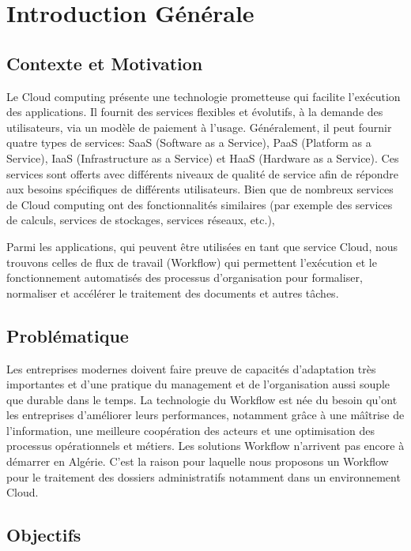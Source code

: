 \chapter*{Introduction Générale }


\section*{Contexte et Motivation} 
Le Cloud computing  présente une technologie prometteuse qui facilite l'exécution des applications. Il fournit des services flexibles et évolutifs, à la demande des utilisateurs, via un modèle de paiement à l'usage. Généralement, il peut fournir quatre types de services: SaaS (Software as a Service), PaaS (Platform as a Service), IaaS (Infrastructure as a Service) et HaaS (Hardware as a Service). Ces services sont offerts avec différents niveaux de qualité de service afin de répondre aux besoins spécifiques de différents utilisateurs. Bien que de nombreux services de Cloud computing  ont des fonctionnalités similaires (par exemple des services de calculs, services de stockages, services  réseaux, etc.),

Parmi les  applications, qui peuvent être  utilisées en tant que service Cloud, nous trouvons celles de flux de travail (Workflow)  qui permettent l'exécution et le fonctionnement automatisés des processus d'organisation pour formaliser, normaliser et accélérer le traitement des documents et autres tâches.




\section*{Problématique}

Les entreprises modernes doivent faire preuve de capacités d'adaptation très importantes et d'une pratique du management et de l'organisation aussi souple que durable dans le temps.  La technologie du Workflow est née du besoin qu'ont les entreprises d'améliorer leurs performances, notamment grâce à une mâîtrise de l'information, une meilleure coopération des acteurs et une optimisation des processus opérationnels et métiers. Les solutions Workflow n’arrivent pas encore à démarrer en Algérie. C’est la raison pour laquelle nous  proposons un Workflow pour le traitement des dossiers administratifs notamment dans un environnement Cloud.


 
\section*{Objectifs}


